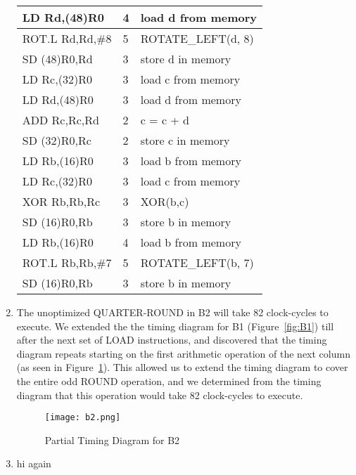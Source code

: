 \begin{enumerate}[wide, label=(B\arabic*)]
\begin{longtable}{|l|l|l|}
LD Rd,(48)R0	& 4	& load d from memory  \\ \hline
ROT.L Rd,Rd,\#8	& 5	& ROTATE\_LEFT(d, 8)  \\ \hline
SD (48)R0,Rd	& 3	& store d in memory   \\ \hline
LD Rc,(32)R0	& 3	& load c from memory  \\ \hline
LD Rd,(48)R0	& 3	& load d from memory  \\ \hline
ADD Rc,Rc,Rd	& 2	& c = c + d           \\ \hline
SD (32)R0,Rc	& 2	& store c in memory   \\ \hline
LD Rb,(16)R0	& 3	& load b from memory  \\ \hline
LD Rc,(32)R0	& 3	& load c from memory  \\ \hline
XOR Rb,Rb,Rc	& 3	& XOR(b,c)            \\ \hline
SD (16)R0,Rb	& 3	& store b in memory   \\ \hline
LD Rb,(16)R0	& 4	& load b from memory  \\ \hline
ROT.L Rb,Rb,\#7	& 5	& ROTATE\_LEFT(b, 7)  \\ \hline
SD (16)R0,Rb	& 3	& store b in memory   \\ \hline
\end{longtable}

\item The unoptimized QUARTER-ROUND in B2 will take 82 clock-cycles to execute. We extended the the timing diagram for B1 (Figure~\ref{fig:B1}) till after the next set of LOAD instructions, and discovered that the timing diagram repeats starting on the first arithmetic operation of the next column (as seen in Figure~\ref{fig:B2}). This allowed us to extend the timing diagram to cover the entire odd ROUND operation, and we determined from the timing diagram that this operation would take 82 clock-cycles to execute.

\begin{figure}[htp]
	\centering
	\texttt{[image: b2.png]}
	\caption{\label{fig:B2}Partial Timing Diagram for B2}
\end{figure}

\item hi again


\end{enumerate}
